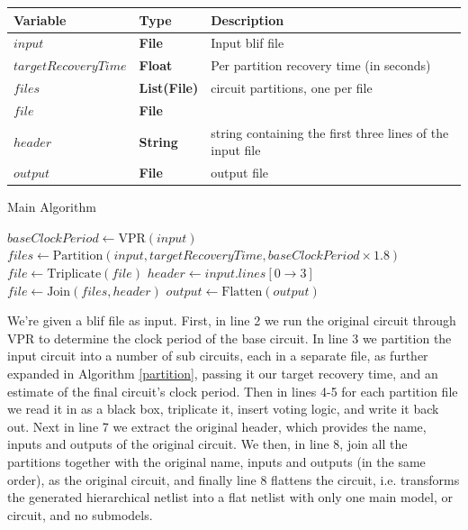 \documentclass[12pt,final,oneside]{dwThesis} %
\begin{document}
   \begin{algorithm}

      \begin{center}

         \begin{tabular}
            {lll} \toprule Variable &
            Type & Description\\
            \midrule $input$ & \textbf{File} &  Input blif
            file\\
            $targetRecoveryTime$ & \textbf{Float} &  Per partition
            recovery time (in seconds) \\
            $files$ & \textbf{List(File)} &
            circuit partitions, one per file \\
            $file$ & \textbf{File} &  \\

            $header$ & \textbf{String} &  string containing the first three
            lines of the input file \\
            $output$ & \textbf{File} &  output
            file\\
            \bottomrule 
         \end{tabular}

      \end{center}
      \caption{Main
         Algorithm}\label{main} 
      \begin{algorithmic}[1]
         \State $baseClockPeriod \gets $VPR$(input)$
         \State $files \gets
         \mbox{Partition}(input, targetRecoveryTime, baseClockPeriod\times1.8)$  
         \State $file \gets \mbox{Triplicate}(file)$ \EndFor 
         \State
         $header \gets input.lines[0\to 3]$ 
         \State $file \gets
         \mbox{Join}(files, header)$ 
         \State $output \gets
         \mbox{Flatten}(output)$ \EndProcedure 
      \end{algorithmic}


   \end{algorithm}
   We're given a blif file as input.
   First, in line 2 we run the original circuit through \gls{VPR} to determine the clock period of the base circuit.
   In line 3 we partition the input circuit into a number of sub circuits, each in a separate file, as
   further expanded in Algorithm \ref{partition}, passing it our target recovery time, and an estimate of the final circuit's clock period.
   Then in lines 4-5 for each
   partition file we read it in as a black box, triplicate it, insert voting
   logic, and write it back out.  Next in line 7 we extract the original
   header, which provides the name, inputs and outputs of the original circuit.
   We then, in line 8, join all the partitions together with the original name,
   inputs and outputs (in the same order), as the original circuit, and finally
   line 8 flattens the circuit, i.e. transforms the generated hierarchical
   netlist into a flat netlist with only one main model, or circuit, and no
   submodels.
\end{document}
